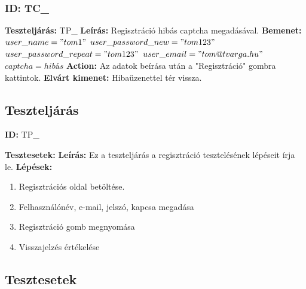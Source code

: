 \documentclass[12pt]{report}
\theoremstyle{definition}
\begin{document}
	\subsubsection{ID: TC\_}\addtocounter{TC}{1}
	\textbf{Teszteljárás:} TP\_
	\newline 
	\textbf{Leírás:} Regisztráció hibás captcha megadásával.
	\newline 
	\textbf{Bemenet:} $user\_name = "tom1"$ $user\_password\_new = "tom123"$ \linebreak$user\_password\_repeat = "tom123"$ $user\_email = "tom@tvarga.hu"$ $captcha = hibás$
	\newline 
	\textbf{Action:} Az adatok beírása után a "Regisztráció" gombra kattintok.
	\newline 
	\textbf{Elvárt kimenet:} Hibaüzenettel tér vissza.
	
	\setcounter{TPTCStop}{\value{TC}}
	\subsection{Teszteljárás}
	\textbf{ID:} TP\_\addtocounter{TP}{1}
	\newline
	\textbf{Tesztesetek:} 
	\newline
	\textbf{Leírás:} Ez a teszteljárás a regisztráció tesztelésének lépéseit írja le.
	\newline
	\textbf{Lépések:}
	\begin{enumerate}
		\item Regisztrációs oldal betöltése.
		\item Felhasználónév, e-mail, jelszó, kapcsa megadása
		\item Regisztráció gomb megnyomása
		\item Visszajelzés értékelése 
	\end{enumerate}
	
	
	
	\subsection{Tesztesetek}
	\setcounter{TPTCStart}{\value{TC}}
	
\end{document}
